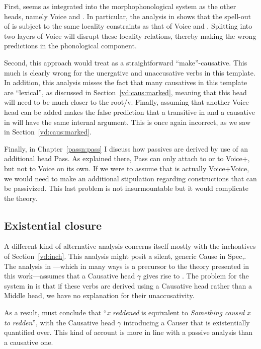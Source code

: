 First, {\vd} seems as integrated into the morphophonological system as the other heads, namely Voice and {\vz}. In particular, the analysis in \cite{kastner18nllt} shows that the spell-out of {\vd} is subject to the same locality constraints as that of Voice and {\vz}. Splitting {\vd} into two layers of Voice will disrupt these locality relations, thereby making the wrong predictions in the phonological component.

Second, this approach would treat {\thif} as a straightforward ``make''-causative. This much is clearly wrong for the unergative and unaccusative verbs in this template. In addition, this analysis misses the fact that many causatives in this template are ``lexical'', as discussed in Section~\ref{vd:caus:marked}, meaning that this head will need to be much closer to the root/v. Finally, assuming that another Voice head can be added makes the false prediction that a transitive in {\tkal} and a causative in {\thif} will have the same internal argument. This is once again incorrect, as we saw in Section~\ref{vd:caus:marked}.

Finally, in Chapter~\ref{passn:pass} I discuss how passives are derived by use of an additional head Pass. As explained there, Pass can only attach to {\vd} or to Voice+{\va}, but not to Voice on its own. If we were to assume that {\vd} is actually Voice+Voice, we would need to make an additional stipulation regarding constructions that can be passivized. This last problem is not insurmountable but it would complicate the theory.

	
	\subsection{Existential closure} \label{vd:others:ed}
A different kind of alternative analysis concerns itself mostly with the inchoatives of Section~\ref{vd:inch}. This analysis might posit a silent, generic Cause in Spec,{\vd}. The analysis in \citet[61]{doron03}---which in many ways is a precursor to the theory presented in this work---assumes that a Causative head $\gamma$ gives rise to {\thif}. The problem for the system in \cite{doron03} is that if these verbs are derived using a Causative head rather than a Middle head, we have no explanation for their unaccusativity.

As a result, \citet[62]{doron03} must conclude that ``\emph{x reddened} is equivalent to \emph{Something caused x to redden}'', with the Causative head $\gamma$ introducing a Causer that is existentially quantified over. This kind of account is more in line with a passive analysis than a causative one.

